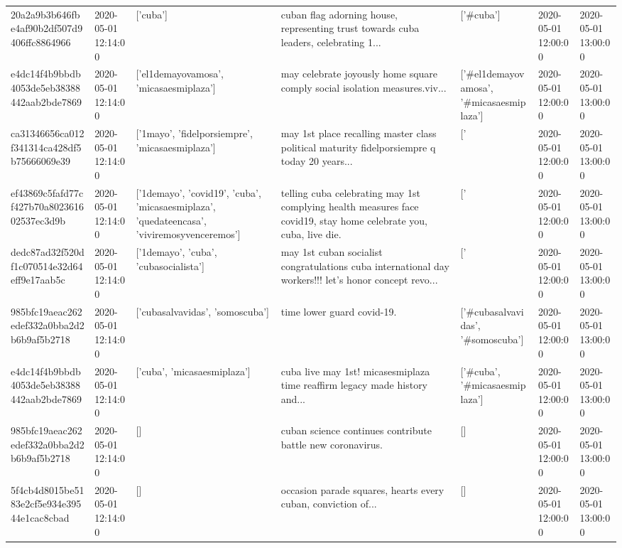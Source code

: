 \begin{tabular}{lllllll}
20a2a9b3b646fbe4af90b2df507d9406ffc8864966 & 2020-05-01 12:14:00 & ['cuba'] & cuban flag adorning house, representing trust towards cuba leaders, celebrating 1... & ['#cuba'] & 2020-05-01 12:00:00 & 2020-05-01 13:00:00 \\
e4dc14f4b9bbdb4053de5eb38388442aab2bde7869 & 2020-05-01 12:14:00 & ['el1demayovamosa', 'micasaesmiplaza'] & may celebrate joyously home square comply social isolation measures.viv... & ['#el1demayovamosa', '#micasaesmiplaza'] & 2020-05-01 12:00:00 & 2020-05-01 13:00:00 \\
ca31346656ca012f341314ca428df5b75666069e39 & 2020-05-01 12:14:00 & ['1mayo', 'fidelporsiempre', 'micasaesmiplaza'] & may 1st place recalling master class political maturity fidelporsiempre q today 20 years... & ['#1mayo', '#fidelporsiempre', '#micasaesmiplaza'] & 2020-05-01 12:00:00 & 2020-05-01 13:00:00 \\
ef43869c5fafd77cf427b70a802361602537ec3d9b & 2020-05-01 12:14:00 & ['1demayo', 'covid19', 'cuba', 'micasaesmiplaza', 'quedateencasa', 'viviremosyvenceremos'] & telling cuba celebrating may 1st complying health measures face covid19, stay home celebrate you, cuba, live die. & ['#1demayo', '#covid19', '#cuba', '#micasaesmiplaza', '#quedateencasa', '#viviremosyvenceremos'] & 2020-05-01 12:00:00 & 2020-05-01 13:00:00 \\
dedc87ad32f520df1c070514e32d64eff9e17aab5c & 2020-05-01 12:14:00 & ['1demayo', 'cuba', 'cubasocialista'] & may 1st cuban socialist congratulations cuba international day workers!!! let's honor concept revo... & ['#1demayo', '#cuba', '#cubasocialista'] & 2020-05-01 12:00:00 & 2020-05-01 13:00:00 \\
985bfc19aeac262edef332a0bba2d2b6b9af5b2718 & 2020-05-01 12:14:00 & ['cubasalvavidas', 'somoscuba'] & time lower guard covid-19. & ['#cubasalvavidas', '#somoscuba'] & 2020-05-01 12:00:00 & 2020-05-01 13:00:00 \\
e4dc14f4b9bbdb4053de5eb38388442aab2bde7869 & 2020-05-01 12:14:00 & ['cuba', 'micasaesmiplaza'] & cuba live may 1st! micasesmiplaza time reaffirm legacy made history and... & ['#cuba', '#micasaesmiplaza'] & 2020-05-01 12:00:00 & 2020-05-01 13:00:00 \\
985bfc19aeac262edef332a0bba2d2b6b9af5b2718 & 2020-05-01 12:14:00 & [] & cuban science continues contribute battle new coronavirus. & [] & 2020-05-01 12:00:00 & 2020-05-01 13:00:00 \\
5f4cb4d8015be5183e2cf5e934e39544e1cac8cbad & 2020-05-01 12:14:00 & [] & occasion parade squares, hearts every cuban, conviction of... & [] & 2020-05-01 12:00:00 & 2020-05-01 13:00:00 \\

\end{tabular}
